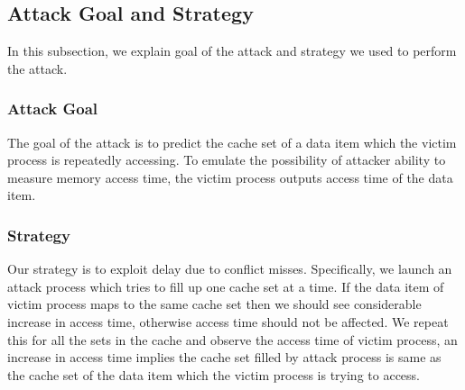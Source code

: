 \documentclass[twocolumn]{IEEEtran}
\begin{document}
\subsection {Attack Goal and Strategy}
In this subsection, we explain goal of the attack and strategy we used to perform the attack.
\subsubsection {Attack Goal}
The goal of the attack is to predict the cache set of a data item which the victim process is repeatedly accessing. To emulate the possibility of attacker ability to measure memory access time, the victim process outputs access time of the data item.
\subsubsection {Strategy}
Our strategy is to exploit delay due to conflict misses. Specifically, we launch an attack process which tries to fill up one cache set at a time. If the data item of victim process maps to the same cache set then we should see considerable increase in access time, otherwise access time should not be affected. We repeat this for all the sets in the cache and observe the access time of victim process, an increase in access time implies the cache set filled by attack process is same as the cache set of the data item which the victim process is trying to access.
\end{document}
